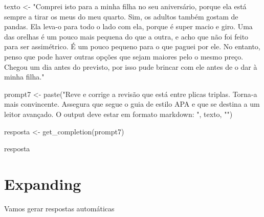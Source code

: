 \documentclass[
  letterpaper,
  paper=6in:9in,
  pagesize=pdftex,
  headinclude=on,
  footinclude=on,
  12pt]{scrbook}
\newenvironment{Shaded}{\begin{snugshade}}{\end{snugshade}}
\newcommand{\FunctionTok}[1]{\textcolor[rgb]{0.28,0.35,0.67}{#1}}
\newcommand{\NormalTok}[1]{\textcolor[rgb]{0.00,0.23,0.31}{#1}}
\newcommand{\OtherTok}[1]{\textcolor[rgb]{0.00,0.23,0.31}{#1}}
\newcommand{\StringTok}[1]{\textcolor[rgb]{0.13,0.47,0.30}{#1}}
\begin{document}
\begin{Shaded}
\begin{Highlighting}[]
\NormalTok{texto }\OtherTok{\textless{}{-}} \StringTok{"Comprei isto para a minha filha no seu aniversário, porque ela está sempre a tirar}
\StringTok{os meus do meu quarto.  Sim, os adultos também gostam de pandas.  Ela leva{-}o}
\StringTok{para todo o lado com ela, porque é super macio e giro.  Uma das orelhas  }
\StringTok{é um pouco mais pequena do que a outra, e acho que não foi feito para ser assimétrico. }
\StringTok{É um pouco pequeno para o que paguei por ele. No entanto, penso que pode haver outras opções que sejam maiores pelo o mesmo preço.  Chegou um dia antes do previsto, por isso pude brincar com ele antes de o dar à minha filha."}

\NormalTok{prompt7 }\OtherTok{\textless{}{-}} \FunctionTok{paste}\NormalTok{(}\StringTok{"Reve e corrige a revisão que está entre plicas triplas. Torna{-}a mais convincente.}
\StringTok{                 Assegura que segue o guia de estilo APA e que se destina a um leitor avançado. }
\StringTok{                 O output deve estar em formato markdown: \textquotesingle{}\textquotesingle{}\textquotesingle{} "}\NormalTok{, texto, }\StringTok{"\textquotesingle{}\textquotesingle{}\textquotesingle{}"}\NormalTok{)}

\NormalTok{resposta }\OtherTok{\textless{}{-}} \FunctionTok{get\_completion}\NormalTok{(prompt7)}

\NormalTok{resposta}
\end{Highlighting}
\end{Shaded}


\hypertarget{expanding}{%
\chapter{Expanding}\label{expanding}}

Vamos gerar respostas automáticas
\end{document}

